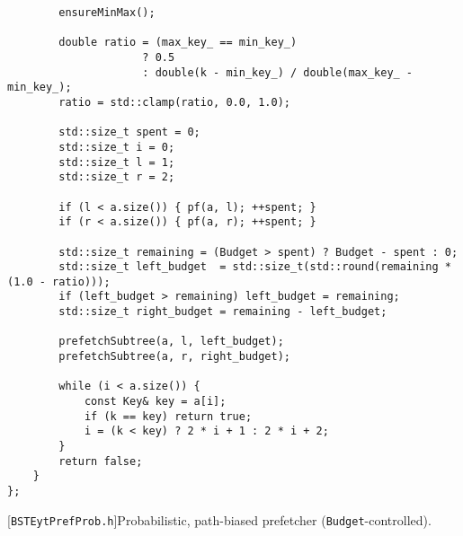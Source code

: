 \begin{lstlisting}
        ensureMinMax();

        double ratio = (max_key_ == min_key_)
                     ? 0.5
                     : double(k - min_key_) / double(max_key_ - min_key_);
        ratio = std::clamp(ratio, 0.0, 1.0);

        std::size_t spent = 0;
        std::size_t i = 0;                
        std::size_t l = 1;                  
        std::size_t r = 2;                  

        if (l < a.size()) { pf(a, l); ++spent; }
        if (r < a.size()) { pf(a, r); ++spent; }

        std::size_t remaining = (Budget > spent) ? Budget - spent : 0;
        std::size_t left_budget  = std::size_t(std::round(remaining * (1.0 - ratio)));
        if (left_budget > remaining) left_budget = remaining;    
        std::size_t right_budget = remaining - left_budget;

        prefetchSubtree(a, l, left_budget);
        prefetchSubtree(a, r, right_budget);

        while (i < a.size()) {
            const Key& key = a[i];
            if (k == key) return true;
            i = (k < key) ? 2 * i + 1 : 2 * i + 2;
        }
        return false;
    }
};
\end{lstlisting}
[\texttt{BSTEytPrefProb.h}]{Probabilistic,
path-biased prefetcher (\texttt{Budget}-controlled).}
\label{lst:bsteyt-pref-prob-h}



